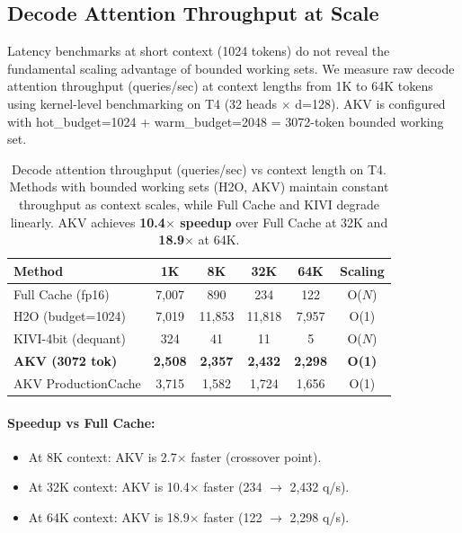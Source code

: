\documentclass[11pt,a4paper]{article}
\begin{document}
\subsection{Decode Attention Throughput at Scale}
\label{sec:throughput}

Latency benchmarks at short context (1024 tokens) do not reveal the fundamental scaling advantage of bounded working sets. We measure raw decode attention throughput (queries/sec) at context lengths from 1K to 64K tokens using kernel-level benchmarking on T4 (32 heads $\times$ d=128). AKV is configured with hot\_budget=1024 + warm\_budget=2048 = 3072-token bounded working set.

\begin{table}[h]
\centering
\begin{tabular}{lccccc}
\toprule
\textbf{Method} & \textbf{1K} & \textbf{8K} & \textbf{32K} & \textbf{64K} & \textbf{Scaling} \\
\midrule
Full Cache (fp16) & 7,007 & 890 & 234 & 122 & O($N$) \\
H2O (budget=1024) & 7,019 & 11,853 & 11,818 & 7,957 & O(1) \\
KIVI-4bit (dequant) & 324 & 41 & 11 & 5 & O($N$) \\
\textbf{AKV (3072 tok)} & \textbf{2,508} & \textbf{2,357} & \textbf{2,432} & \textbf{2,298} & \textbf{O(1)} \\
AKV ProductionCache & 3,715 & 1,582 & 1,724 & 1,656 & O(1) \\
\bottomrule
\end{tabular}
\caption{Decode attention throughput (queries/sec) vs context length on T4. Methods with bounded working sets (H2O, AKV) maintain constant throughput as context scales, while Full Cache and KIVI degrade linearly. AKV achieves \textbf{10.4$\times$ speedup} over Full Cache at 32K and \textbf{18.9$\times$} at 64K.}
\label{tab:throughput}
\end{table}

\paragraph{Speedup vs Full Cache:}
\begin{itemize}
    \item At 8K context: AKV is 2.7$\times$ faster (crossover point).
    \item At 32K context: AKV is 10.4$\times$ faster (234 $\to$ 2,432 q/s).
    \item At 64K context: AKV is 18.9$\times$ faster (122 $\to$ 2,298 q/s).
\end{itemize}
\end{document}
